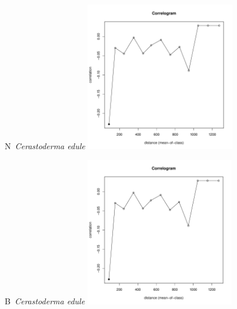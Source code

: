 \documentclass[12pt, a4paper]{disser}
\begin{document}
\begin{figure}[h]
	
	\begin{minipage}[b]{.46\linewidth}
	\begin{center}
	{\small N~{\it Cerastoderma edule}}
		\includegraphics[width=65mm]{../Barenc_Sea/distribution_Moran/Plyazh082_moran_B_Cerastoderma_edule_.pdf}

	\end{center}
	\end{minipage}
	\hfil %
	\begin{minipage}[b]{.46\linewidth}
	\begin{center}
	{\small B~{\it Cerastoderma edule}}
		\includegraphics[width=65mm]{../Barenc_Sea/distribution_Moran/Plyazh082_moran_B_Cerastoderma_edule_.pdf}
	\end{center}
	\end{minipage}






\end{figure}
\end{document}

